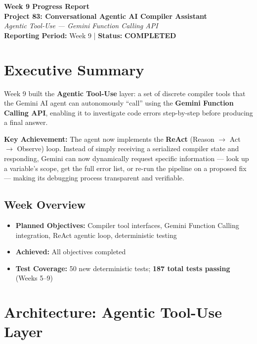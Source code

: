 \documentclass[a4paper,11pt]{article}
\newcommand{\statusgood}[1]{\colorbox{green!20}{\textbf{#1}}}
\begin{document}
\begin{center}
    {\huge \textbf{Week 9 Progress Report}} \\
    \vspace{3mm}
    {\large \textbf{Project 83: Conversational Agentic AI Compiler Assistant}} \\
    \vspace{2mm}
    \textit{Agentic Tool-Use --- Gemini Function Calling API} \\
    \vspace{2mm}
    \textbf{Reporting Period:} Week 9 | \textbf{Status:} \statusgood{COMPLETED}
\end{center}

\vspace{5mm}

\section{Executive Summary}

Week 9 built the \textbf{Agentic Tool-Use} layer: a set of discrete compiler tools that the Gemini AI agent can autonomously ``call'' using the \textbf{Gemini Function Calling API}, enabling it to investigate code errors step-by-step before producing a final answer.

\textbf{Key Achievement:} The agent now implements the \textbf{ReAct} (Reason $\rightarrow$ Act $\rightarrow$ Observe) loop. Instead of simply receiving a serialized compiler state and responding, Gemini can now dynamically request specific information --- look up a variable's scope, get the full error list, or re-run the pipeline on a proposed fix --- making its debugging process transparent and verifiable.

\subsection{Week Overview}
\begin{itemize}[leftmargin=*]
    \item \textbf{Planned Objectives:} Compiler tool interfaces, Gemini Function Calling integration, ReAct agentic loop, deterministic testing
    \item \textbf{Achieved:} All objectives completed
    \item \textbf{Test Coverage:} 50 new deterministic tests; \textbf{187 total tests passing} (Weeks 5--9)
\end{itemize}

\section{Architecture: Agentic Tool-Use Layer}
\end{document}
